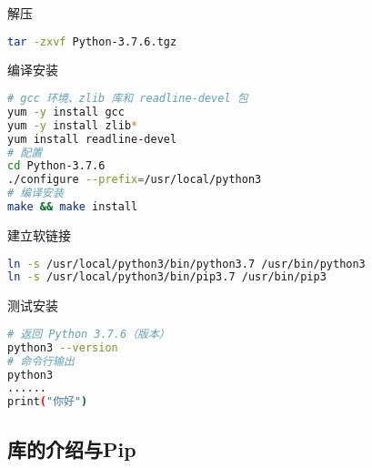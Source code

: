 解压
\begin{lstlisting}[language=bash]
tar -zxvf Python-3.7.6.tgz
\end{lstlisting}

编译安装
\begin{lstlisting}[language=bash]
# gcc 环境、zlib 库和 readline-devel 包
yum -y install gcc
yum -y install zlib*
yum install readline-devel
# 配置
cd Python-3.7.6
./configure --prefix=/usr/local/python3
# 编译安装
make && make install
\end{lstlisting}

建立软链接
\begin{lstlisting}[language=bash]
ln -s /usr/local/python3/bin/python3.7 /usr/bin/python3
ln -s /usr/local/python3/bin/pip3.7 /usr/bin/pip3
\end{lstlisting}

测试安装
\begin{lstlisting}[language=bash]
# 返回 Python 3.7.6（版本）
python3 --version
# 命令行输出
python3
......
print("你好")
\end{lstlisting}

\subsection{库的介绍与Pip} 

